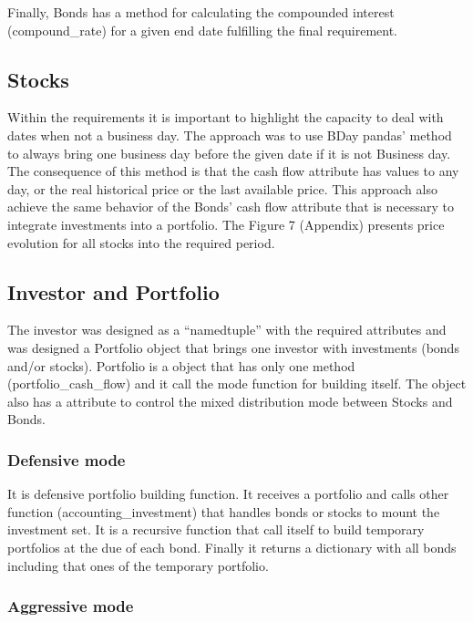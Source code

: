 \documentclass[
  11pt,
]{article}
\begin{document}
Finally, Bonds has a method for calculating the compounded interest (compound\_rate) for a given end date fulfilling the final requirement.

\hypertarget{stocks}{%
\subsection{Stocks}\label{stocks}}

Within the requirements it is important to highlight the capacity to deal with dates when not a business day. The approach was to use BDay pandas' method to always bring one business day before the given date if it is not Business day. The consequence of this method is that the cash flow attribute has values to any day, or the real historical price or the last available price. This approach also achieve the same behavior of the Bonds' cash flow attribute that is necessary to integrate investments into a portfolio. The Figure 7 (Appendix) presents price evolution for all stocks into the required period.

\hypertarget{investor-and-portfolio}{%
\subsection{Investor and Portfolio}\label{investor-and-portfolio}}

The investor was designed as a ``namedtuple'' with the required attributes and was designed a Portfolio object that brings one investor with investments (bonds and/or stocks). Portfolio is a object that has only one method (portfolio\_cash\_flow) and it call the mode function for building itself. The object also has a attribute to control the mixed distribution mode between Stocks and Bonds.

\hypertarget{defensive-mode}{%
\subsubsection{Defensive mode}\label{defensive-mode}}

It is defensive portfolio building function. It receives a portfolio and calls other function (accounting\_investment) that handles bonds or stocks to mount the investment set. It is a recursive function that call itself to build temporary portfolios at the due of each bond. Finally it returns a dictionary with all bonds including that ones of the temporary portfolio.

\hypertarget{aggressive-mode}{%
\subsubsection{Aggressive mode}\label{aggressive-mode}}
\end{document}
